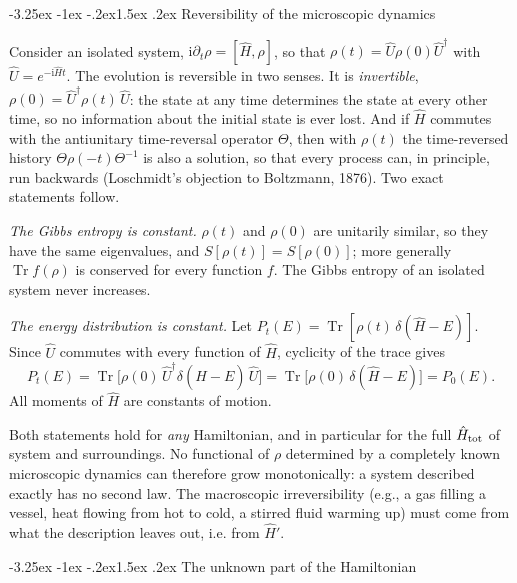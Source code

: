 \documentclass[10pt,a4paper]{article}
\makeatletter
\renewcommand{\subsection}{\@startsection{subsection}{2}{\z@}%
  {-3.25ex \@plus -1ex \@minus -.2ex}{1.5ex \@plus .2ex}%
  {\normalfont\fontsize{15.5pt}{19pt}\selectfont\bfseries}}
\newcommand{\ii}{\mathrm{i}}
\newcommand{\Tr}{\operatorname{Tr}}
\makeatother
\begin{document}
\subsection{Reversibility of the microscopic dynamics}
\label{sec:found_unitary}

Consider an isolated system, $ \ii\partial_t\rho = [\hat H, \rho] $, so that $ \rho(t) = \hat U\rho(0)\hat U^\dagger $ with $ \hat U = e^{-\ii \hat Ht} $.
The evolution is reversible in two senses.
It is \emph{invertible}, $ \rho(0) = \hat U^\dagger\rho(t)\,\hat U $: the state at any time determines the state at every other time, so no information about the initial state is ever lost.
And if $ \hat H $ commutes with the antiunitary time-reversal operator $ \Theta $, then with $ \rho(t) $ the time-reversed history $ \Theta\rho(-t)\Theta^{-1} $ is also a solution, so that every process can, in principle, run backwards (Loschmidt's objection to Boltzmann, 1876).
Two exact statements follow.

\emph{The Gibbs entropy is constant.}
$ \rho(t) $ and $ \rho(0) $ are unitarily similar, so they have the same eigenvalues, and $ S[\rho(t)] = S[\rho(0)] $; more generally $ \Tr f(\rho) $ is conserved for every function $ f $.
The Gibbs entropy of an isolated system never increases.

\emph{The energy distribution is constant.}
Let $ P_t(E) = \Tr[\rho(t)\,\delta(\hat H - E)] $.
Since $ \hat U $ commutes with every function of $ \hat H $, cyclicity of the trace gives
\[
  P_t(E) = \Tr\big[\rho(0)\,\hat U^\dagger\delta(\hat H - E)\,\hat U\big]
  = \Tr\big[\rho(0)\,\delta(\hat H - E)\big] = P_0(E) .
\]
All moments of $ \hat H $ are constants of motion.

Both statements hold for \emph{any} Hamiltonian, and in particular for the full $ \hat H_{\rm tot} $ of system and surroundings.
No functional of $ \rho $ determined by a completely known microscopic dynamics can therefore grow monotonically: a system described exactly has no second law.
The macroscopic irreversibility (e.g., a gas filling a vessel, heat flowing from hot to cold, a stirred fluid warming up) must come from what the description leaves out, i.e. from $ \hat H' $.

\subsection{The unknown part of the Hamiltonian}
\label{sec:found_second}
\end{document}
